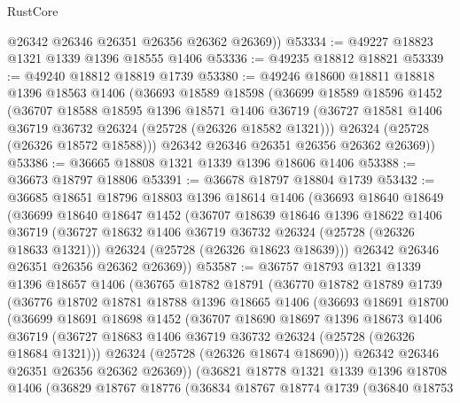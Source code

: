 \begin{lexlean}{RustCore}
\begin{coremodule}
        @26342
        @26346
        @26351
        @26356
        @26362
        @26369))
@53334 := @49227 @18823 @1321 @1339 @1396 @18555 @1406
@53336 := @49235 @18812 @18821
@53339 := @49240 @18812 @18819 @1739
@53380 := @49246
    @18600
    @18811
    @18818
    @1396
    @18563
    @1406
    (@36693
      @18589
      @18598
      (@36699
        @18589
        @18596
        @1452
        (@36707
          @18588
          @18595
          @1396
          @18571
          @1406
          @36719
          (@36727 @18581 @1406 @36719 @36732 @26324 (@25728 (@26326 @18582 @1321)))
          @26324
          (@25728 (@26326 @18572 @18588)))
        @26342
        @26346
        @26351
        @26356
        @26362
        @26369))
@53386 := @36665 @18808 @1321 @1339 @1396 @18606 @1406
@53388 := @36673 @18797 @18806
@53391 := @36678 @18797 @18804 @1739
@53432 := @36685
    @18651
    @18796
    @18803
    @1396
    @18614
    @1406
    (@36693
      @18640
      @18649
      (@36699
        @18640
        @18647
        @1452
        (@36707
          @18639
          @18646
          @1396
          @18622
          @1406
          @36719
          (@36727 @18632 @1406 @36719 @36732 @26324 (@25728 (@26326 @18633 @1321)))
          @26324
          (@25728 (@26326 @18623 @18639)))
        @26342
        @26346
        @26351
        @26356
        @26362
        @26369))
@53587 := @36757
    @18793
    @1321
    @1339
    @1396
    @18657
    @1406
    (@36765
      @18782
      @18791
      (@36770
        @18782
        @18789
        @1739
        (@36776
          @18702
          @18781
          @18788
          @1396
          @18665
          @1406
          (@36693
            @18691
            @18700
            (@36699
              @18691
              @18698
              @1452
              (@36707
                @18690
                @18697
                @1396
                @18673
                @1406
                @36719
                (@36727 @18683 @1406 @36719 @36732 @26324 (@25728 (@26326 @18684 @1321)))
                @26324
                (@25728 (@26326 @18674 @18690)))
              @26342
              @26346
              @26351
              @26356
              @26362
              @26369))
          (@36821
            @18778
            @1321
            @1339
            @1396
            @18708
            @1406
            (@36829
              @18767
              @18776
              (@36834
                @18767
                @18774
                @1739
                (@36840
                  @18753

\end{coremodule}
\end{lexlean}
